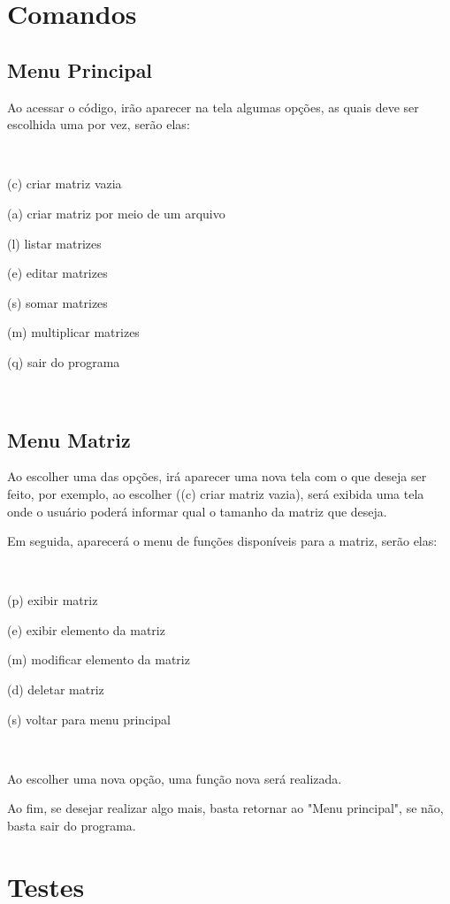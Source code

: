 \documentclass{article}
\begin{document}
\section{Comandos}

\subsection{Menu Principal}

Ao acessar o código, irão aparecer na tela algumas opções, as quais deve ser escolhida uma por vez, serão elas:

~~~~~~~~~~~~~~~~~~~~~~~~~~~~~~~~~~

(c) criar matriz vazia

(a) criar matriz por meio de um arquivo

(l) listar matrizes

(e) editar matrizes

(s) somar matrizes

(m) multiplicar matrizes

(q) sair do programa

~~~~~~~~~~~~~~~~~~~~~~~~~~~~~~~~~~

\subsection{Menu Matriz}

Ao escolher uma das opções, irá aparecer uma nova tela com o que deseja ser feito, por exemplo, ao escolher ((c) criar matriz vazia), será exibida uma tela onde o usuário poderá informar qual o tamanho da matriz que deseja. 

Em seguida, aparecerá o menu de funções disponíveis para a matriz, serão elas:

~~~~~~~~~~~~~~~~~~~~~~~~~~~~~~~~~~~

(p) exibir matriz 

(e) exibir elemento da matriz

(m) modificar elemento da matriz

(d) deletar matriz

(s) voltar para menu principal

~~~~~~~~~~~~~~~~~~~~~~~~~~~~~~~~~~~~

Ao escolher uma nova opção, uma função nova será realizada. 

Ao fim, se desejar realizar algo mais, basta retornar ao "Menu principal", se não, basta sair do programa.

\section{Testes}
\end{document}
